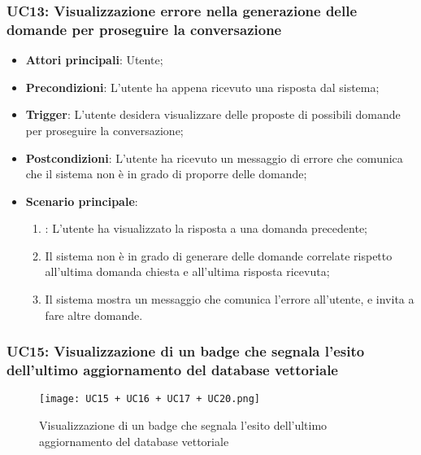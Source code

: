 \subsubsection{UC13: Visualizzazione errore nella generazione delle domande per proseguire la conversazione}
\begin{itemize}
    \item \textbf{Attori principali}: Utente;
    \item \textbf{Precondizioni}: L'utente ha appena ricevuto una risposta dal sistema;
    \item \textbf{Trigger}: L'utente desidera visualizzare delle proposte di possibili domande per proseguire la conversazione;
    \item \textbf{Postcondizioni}: L'utente ha ricevuto un messaggio di errore che comunica che il sistema non è in grado di proporre delle domande;
    \item \textbf{Scenario principale}:
    \begin{enumerate}
        \item {}: L'utente ha visualizzato la risposta a una domanda precedente;
        \item Il sistema non è in grado di generare delle domande correlate rispetto all'ultima domanda chiesta
        e all'ultima risposta ricevuta;
        \item Il sistema mostra un messaggio che comunica l'errore all'utente, e invita a fare altre domande.
    \end{enumerate}
\end{itemize}

\newpage

\hypertarget{UC15}{}
\subsubsection{UC15: Visualizzazione di un badge che segnala l'esito dell'ultimo aggiornamento del database vettoriale}

\begin{figure}[h]
    \centering
    \texttt{[image: UC15 + UC16 + UC17 + UC20.png]}
    \caption{Visualizzazione di un badge che segnala l'esito dell'ultimo aggiornamento del database vettoriale}
\end{figure}


